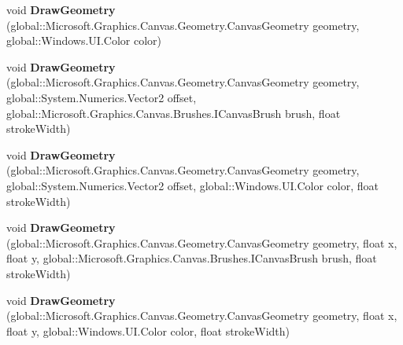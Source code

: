 \begin{DoxyCompactItemize}
\item 
\mbox{\label{class_microsoft_1_1_graphics_1_1_canvas_1_1_canvas_drawing_session_a5a2b8f162f82d4372e8b03282c459d40}} 
void {\bfseries Draw\+Geometry} (global\+::\+Microsoft.\+Graphics.\+Canvas.\+Geometry.\+Canvas\+Geometry geometry, global\+::\+Windows.\+U\+I.\+Color color)
\item 
\mbox{\label{class_microsoft_1_1_graphics_1_1_canvas_1_1_canvas_drawing_session_ae9bcaec580062c76649917b8be272f72}} 
void {\bfseries Draw\+Geometry} (global\+::\+Microsoft.\+Graphics.\+Canvas.\+Geometry.\+Canvas\+Geometry geometry, global\+::\+System.\+Numerics.\+Vector2 offset, global\+::\+Microsoft.\+Graphics.\+Canvas.\+Brushes.\+I\+Canvas\+Brush brush, float stroke\+Width)
\item 
\mbox{\label{class_microsoft_1_1_graphics_1_1_canvas_1_1_canvas_drawing_session_af1df685cb1900e0ed10ebd2bde5e4fa5}} 
void {\bfseries Draw\+Geometry} (global\+::\+Microsoft.\+Graphics.\+Canvas.\+Geometry.\+Canvas\+Geometry geometry, global\+::\+System.\+Numerics.\+Vector2 offset, global\+::\+Windows.\+U\+I.\+Color color, float stroke\+Width)
\item 
\mbox{\label{class_microsoft_1_1_graphics_1_1_canvas_1_1_canvas_drawing_session_a713656e57a0727d2d1dab9fb1b0f17ec}} 
void {\bfseries Draw\+Geometry} (global\+::\+Microsoft.\+Graphics.\+Canvas.\+Geometry.\+Canvas\+Geometry geometry, float x, float y, global\+::\+Microsoft.\+Graphics.\+Canvas.\+Brushes.\+I\+Canvas\+Brush brush, float stroke\+Width)
\item 
\mbox{\label{class_microsoft_1_1_graphics_1_1_canvas_1_1_canvas_drawing_session_a7e7853ba7de2d027dc3f6d10937c1a2f}} 
void {\bfseries Draw\+Geometry} (global\+::\+Microsoft.\+Graphics.\+Canvas.\+Geometry.\+Canvas\+Geometry geometry, float x, float y, global\+::\+Windows.\+U\+I.\+Color color, float stroke\+Width)
\item 
\mbox{\label{class_microsoft_1_1_graphics_1_1_canvas_1_1_canvas_drawing_session_aec6beeaf3963df362041af465297d038}} 

\end{DoxyCompactItemize}
